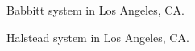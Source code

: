 \documentclass[twocolumn,10pt]{asme2ej}
\begin{document}
\begin{figure}[h!]
\begin{center}
\end{center}
\caption{Babbitt system in Los Angeles, CA.}
\label{fig:babbitt}
\end{figure}

\begin{figure}[h!]
\begin{center}
\end{center}
\caption{Halstead system in Los Angeles, CA.}
\label{fig:halstead}
\end{figure}
\end{document}
